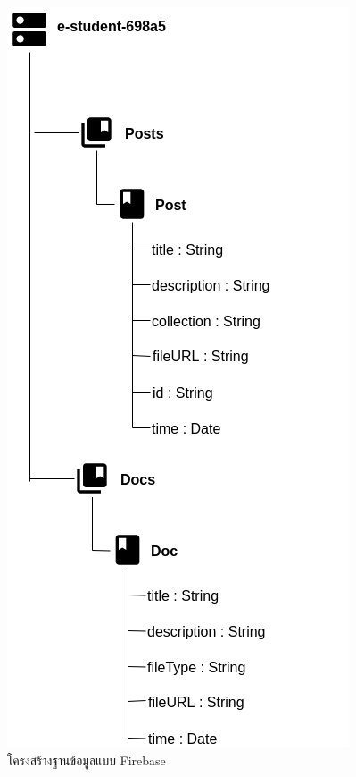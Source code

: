 	\begin{figure}[H]
	\centering
	\includegraphics[width=0.7\columnwidth]
	{Figures/3/DB/DB1}
	\caption{โครงสร้างฐานข้อมูลแบบ Firebase}
	\label{Fig:DB1}
	\end{figure}

